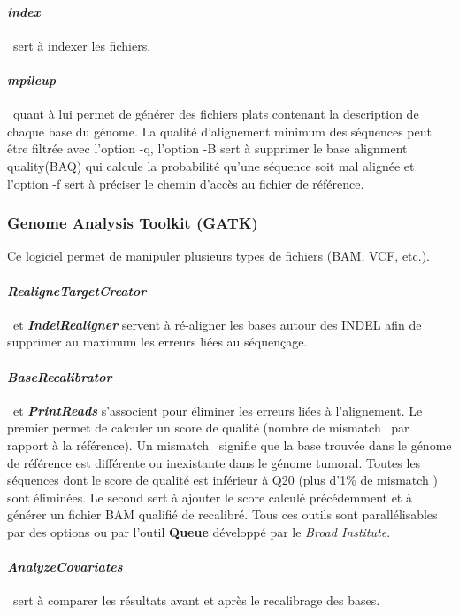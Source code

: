 \paragraph*{\textit{index}} ~sert à indexer les fichiers.
\paragraph*{\textit{mpileup}} ~quant à lui permet de générer des fichiers plats contenant la description de chaque base du génome. La qualité d'alignement minimum des séquences peut être filtrée avec l'option -q, l'option -B sert à supprimer le \og base alignment quality\fg (BAQ) qui calcule la probabilité qu'une séquence soit mal alignée et l'option -f sert à préciser le chemin d'accès au fichier de référence.

\subsubsection{Genome Analysis Toolkit (GATK)} 

Ce logiciel permet de manipuler plusieurs types de fichiers (BAM, VCF, etc.). \paragraph*{\textit{RealigneTargetCreator}} ~et \textbf{\textit{IndelRealigner}} servent à ré-aligner les bases autour des INDEL afin de supprimer au maximum les erreurs liées au séquençage. 
\paragraph*{\textit{BaseRecalibrator}} ~et \textbf{\textit{PrintReads}} s'associent pour éliminer les erreurs liées à l'alignement. Le premier permet de calculer un score de qualité (nombre de \og mismatch \fg ~par rapport à la référence). Un \og mismatch \fg ~signifie que la base trouvée dans le génome de référence est différente ou inexistante dans le génome tumoral. Toutes les séquences dont le score de qualité est inférieur à Q20 (plus d'1\% de \og mismatch \fg) sont éliminées. Le second sert à ajouter le score calculé précédemment et à générer un fichier BAM qualifié de recalibré. Tous ces outils sont parallélisables par des options ou par l'outil \textbf{Queue} développé par le \textit{Broad Institute}.\\
\paragraph*{\textit{\textbf{AnalyzeCovariates}}} ~sert à comparer les résultats avant et après le recalibrage des bases.


